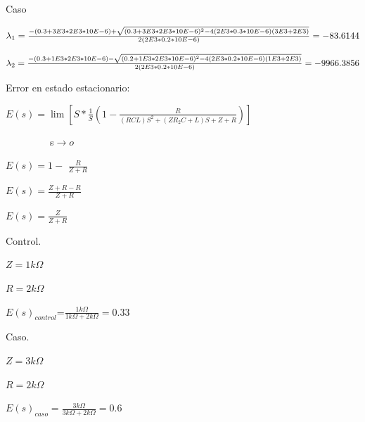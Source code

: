 \documentclass{article}
\begin{document}
Caso

$\lambda _{1} =\frac{ -\left (0.3 +3E3 \ast 2E3 \ast 10E -6\right ) +\sqrt{%
(0.3 +3E3 \ast 2E3 \ast 10E -6)^{2} -4\left (2E3 \ast 0.3 \ast 10E -6\right
)\left (3E3 +2E3\right )}}{2\left (2E3 \ast 0.2 \ast 10E -6\right )} =
-83.6144$

$\lambda _{2}=\frac{-\left( 0.3+1E3\ast 2E3\ast 10E-6\right) -\sqrt{%
(0.2+1E3\ast 2E3\ast 10E-6)^{2}-4\left( 2E3\ast 0.2\ast 10E-6\right) \left(
1E3+2E3\right) }}{2\left( 2E3\ast 0.2\ast 10E-6\right) }=-9966.3856$

Error en estado estacionario:

$E(s)=\lim \left[ S\ast \frac{1}{S}(1-\frac{R}{(RCL)S^{2}+(ZR_{2}C+L)S+Z+R})%
\right] $

\ \ \ \ \ \ \ \ \ s$\rightarrow o$

$E(s)=1-$ $\frac{R}{Z+R}$

$E(s)=\frac{Z+R-R}{Z+R}$

$E(s)=\frac{Z}{Z+R}$

\bigskip

Control.

$Z=1k\Omega $

$R=2k\Omega $

$E(s)_{control}$=$\frac{1k\Omega }{1k\Omega +2k\Omega }=0.33$

Caso.

$Z=3k\Omega $

$R=2k\Omega $

$E(s)_{caso}=\frac{3k\Omega }{3k\Omega +2k\Omega }=0.6$
\end{document}
